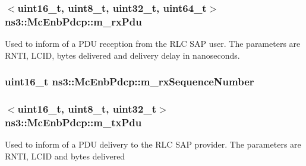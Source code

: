 \subsubsection[{\texorpdfstring{m\+\_\+rx\+Pdu}{m_rxPdu}}]{$<$uint16\+\_\+t, uint8\+\_\+t, uint32\+\_\+t, uint64\+\_\+t$>$ ns3\+::\+Mc\+Enb\+Pdcp\+::m\+\_\+rx\+Pdu\hspace{0.3cm}{\ttfamily [protected]}}\hypertarget{classns3_1_1McEnbPdcp_af263990d8ad04a88ad3d6a4fba42c976}{}\label{classns3_1_1McEnbPdcp_af263990d8ad04a88ad3d6a4fba42c976}
Used to inform of a P\+DU reception from the R\+LC S\+AP user. The parameters are R\+N\+TI, L\+C\+ID, bytes delivered and delivery delay in nanoseconds. 
\subsubsection[{\texorpdfstring{m\+\_\+rx\+Sequence\+Number}{m_rxSequenceNumber}}]{\setlength{\rightskip}{0pt plus 5cm}uint16\+\_\+t ns3\+::\+Mc\+Enb\+Pdcp\+::m\+\_\+rx\+Sequence\+Number\hspace{0.3cm}{\ttfamily [private]}}\hypertarget{classns3_1_1McEnbPdcp_a90daa41419ecf2e8f45310bc6dc48ad8}{}\label{classns3_1_1McEnbPdcp_a90daa41419ecf2e8f45310bc6dc48ad8}
\subsubsection[{\texorpdfstring{m\+\_\+tx\+Pdu}{m_txPdu}}]{$<$uint16\+\_\+t, uint8\+\_\+t, uint32\+\_\+t$>$ ns3\+::\+Mc\+Enb\+Pdcp\+::m\+\_\+tx\+Pdu\hspace{0.3cm}{\ttfamily [protected]}}\hypertarget{classns3_1_1McEnbPdcp_a48d23e15667a3d5cc447019b595196ba}{}\label{classns3_1_1McEnbPdcp_a48d23e15667a3d5cc447019b595196ba}
Used to inform of a P\+DU delivery to the R\+LC S\+AP provider. The parameters are R\+N\+TI, L\+C\+ID and bytes delivered 
